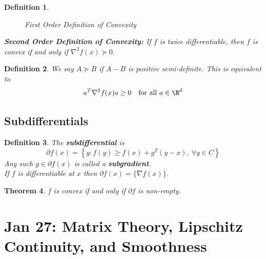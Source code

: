 \documentclass[a4paper]{article}
\newtheorem{thm}{Theorem}[section]
\newtheorem{defn}[thm]{Definition}
\begin{document}
\begin{defn}
\begin{figure}[H]
        \caption{First Order Definition of Convexity}
    \end{figure}

    \noindent\textbf{Second Order Definition of Convexity:} If $f$ is twice differentiable, then $f$ is convex if and only if $\nabla^2 f(x) \succeq 0$.
\end{defn}

\begin{defn}
    We say $A \succeq B$ if $A - B$ is positive semi-definite. This is equivalent to
    \[
        a^T \nabla^2 f(x) a \geq 0 \quad \text{for all}\ a \in \R^d
    \]
\end{defn}

\subsection{Subdifferentials}
\begin{defn}
    The \textbf{subdifferential} is
    \[
        \partial f(x) = \left\{ g : f(y) \geq f(x) + g^T (y-x),\ \forall y \in C \right\}
    \]
    Any such $g \in \partial f(x)$ is called a \textbf{subgradient}.\\
    If $f$ is differentiable at $x$ then $\partial f(x) = \{ \nabla f(x) \}$.
\end{defn}
\begin{thm}
    $f$ is convex if and only if $\partial f$ is non-empty. 
\end{thm}

\newpage
\section{Jan 27: Matrix Theory, Lipschitz Continuity, and Smoothness}
\end{document}
